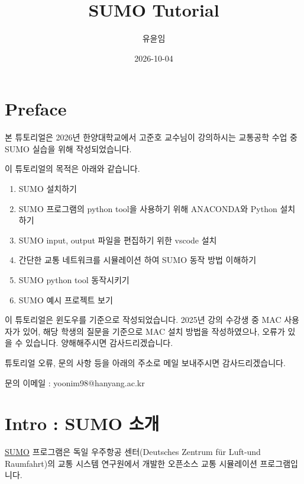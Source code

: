 \documentclass[
  letterpaper,
  DIV=11,
  numbers=noendperiod]{scrreprt}
\title{SUMO Tutorial}
\author{유윤임}
\date{2026-10-04}
\providecommand{\tightlist}{%
  \setlength{\itemsep}{0pt}\setlength{\parskip}{0pt}}
\renewcommand*\contentsname{Table of contents}
\newcommand\contentsname{Table of contents}
\begin{document}
\maketitle

\renewcommand*\contentsname{Table of contents}
{
\setcounter{tocdepth}{2}
\tableofcontents
}


\chapter*{Preface}\label{preface}


본 튜토리얼은 2026년 한양대학교에서 고준호 교수님이 강의하시는 교통공학
수업 중 SUMO 실습을 위해 작성되었습니다.

이 튜토리얼의 목적은 아래와 같습니다.

\begin{enumerate}
\def\labelenumi{\arabic{enumi}.}
\tightlist
\item
  SUMO 설치하기
\item
  SUMO 프로그램의 python tool을 사용하기 위해 ANACONDA와 Python 설치하기
\item
  SUMO input, output 파일을 편집하기 위한 vscode 설치
\item
  간단한 교통 네트워크를 시뮬레이션 하여 SUMO 동작 방법 이해하기
\item
  SUMO python tool 동작시키기
\item
  SUMO 예시 프로젝트 보기
\end{enumerate}

이 튜토리얼은 윈도우를 기준으로 작성되었습니다. 2025년 강의 수강생 중
MAC 사용자가 있어, 해당 학생의 질문을 기준으로 MAC 설치 방법을
작성하였으나, 오류가 있을 수 있습니다. 양해해주시면 감사드리겠습니다.

튜토리얼 오류, 문의 사항 등을 아래의 주소로 메일 보내주시면
감사드리겠습니다.

문의 이메일 : yoonim98@hanyang.ac.kr


\chapter{Intro : SUMO 소개}\label{intro-sumo-uxc18cuxac1c}

\href{https://eclipse.dev/sumo/}{SUMO} 프로그램은 독일 우주항공
센터(Deutsches Zentrum für Luft-und Raumfahrt)의 교통 시스템 연구원에서
개발한 오픈소스 교통 시뮬레이션 프로그램입니다.
\end{document}
